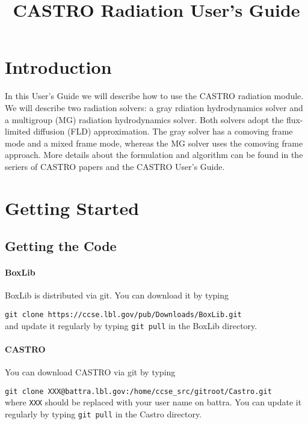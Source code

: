 \documentclass[11pt,letterpaper]{article}
\begin{document}
\title{CASTRO Radiation User's Guide}
\maketitle

\section{Introduction}

In this User's Guide we will describe how to use the CASTRO radiation
module.  We will describe two radiation solvers: a gray rdiation
hydrodynamics solver and a multigroup (MG) radiation hydrodynamics
solver.  Both solvers adopt the flux-limited diffusion (FLD)
approximation.  The gray solver has a comoving frame mode and a mixed
frame mode, whereas the MG solver uses the comoving frame approach.
More details about the formulation and algorithm can be found in the
seriers of CASTRO papers and the CASTRO User's Guide.

\section{Getting Started}

\subsection{Getting the Code}

\paragraph{BoxLib} BoxLib is distributed via git.  You can download it
by typing
\vspace{5pt}

\verb|git clone https://ccse.lbl.gov/pub/Downloads/BoxLib.git|\\[5pt]
and update it regularly by typing \verb|git pull| in the BoxLib
directory. 

\paragraph{CASTRO} You can download CASTRO via git by typing
\vspace{5pt}

\verb|git clone XXX@battra.lbl.gov:/home/ccse_src/gitroot/Castro.git|\\[5pt]
where {\tt XXX} should be replaced with your user name on battra.  You
can update it regularly by typing \verb|git pull| in the Castro
directory.
\end{document}
